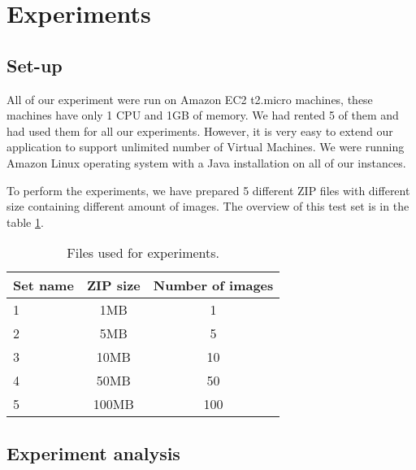\section{Experiments}
\label{exp}

\subsection{Set-up}
All of our experiment were run on Amazon EC2 t2.micro machines, these machines have only 1 CPU and 1GB of memory. We had rented 5 of them and had used them for all our experiments. However, it is very easy to extend our application to support unlimited number of Virtual Machines. We were running Amazon Linux operating system with a Java installation on all of our instances.

To perform the experiments, we have prepared 5 different ZIP files with different size containing different amount of images. The overview of this test set is in the table \ref{testset}.

\begin{table}
\centering
 \label{testset}
 \begin{tabular}{| l | c | c |}
  \hline
  Set name & ZIP size & Number of images \\
  \hline
  \hline
  1 & 1MB & 1\\
  2 & 5MB & 5\\
  3 & 10MB & 10\\
  4 & 50MB & 50\\
  5 & 100MB & 100\\
  \hline
 \end{tabular}

 \caption{Files used for experiments.}
\end{table}

\subsection{Experiment analysis}

